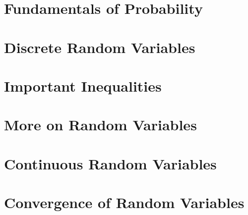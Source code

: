 \documentclass[british,11pt,a4paper]{report}
\begin{document}
\maketitle
\tableofcontents
\chapter{Fundamentals of Probability}

\chapter{Discrete Random Variables}

\chapter{Important Inequalities}

\chapter{More on Random Variables}

\chapter{Continuous Random Variables}

\chapter{Convergence of Random Variables}

\end{document}
